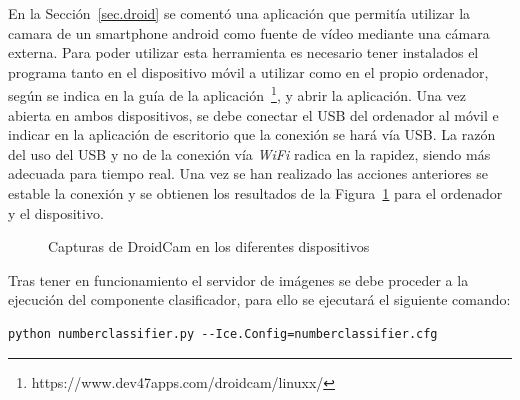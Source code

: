 En la Sección~\ref{sec.droid} se comentó una aplicación que permitía utilizar la camara de un smartphone android como fuente de vídeo mediante una cámara externa. Para poder utilizar esta herramienta es necesario tener instalados el programa tanto en el dispositivo móvil a utilizar como en el propio ordenador, según se indica en la guía de la aplicación~\footnote{https://www.dev47apps.com/droidcam/linuxx/}, y abrir la aplicación. Una vez abierta en ambos dispositivos, se debe conectar el USB del ordenador al móvil e indicar en la aplicación de escritorio que la conexión se hará vía USB. La razón del uso del USB y no de la conexión vía \textit{WiFi} radica en la rapidez, siendo más adecuada para tiempo real. Una vez se han realizado las acciones anteriores se estable la conexión y se obtienen los resultados de la Figura~\ref{fig.droid} para el ordenador y el dispositivo.

\begin{figure}[H]
	\centering
	 \hspace{10pt}
	\caption{Capturas de DroidCam en los diferentes dispositivos}
	\label{fig.droid}
\end{figure}

Tras tener en funcionamiento el servidor de imágenes se debe proceder a la ejecución del componente clasificador, para ello se ejecutará el siguiente comando:
\vspace{10pt}
\begin{lstlisting}[frame=single]
	python numberclassifier.py --Ice.Config=numberclassifier.cfg
\end{lstlisting}


